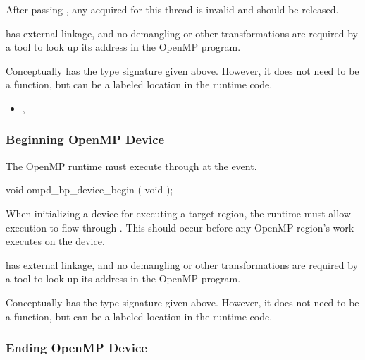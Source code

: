 After passing , any  acquired for this thread 
is invalid and should be released.

\restrictions

 has external  linkage, and no
demangling or other transformations are required by a tool
to look up its address in the OpenMP program.

Conceptually  has the type signature
given above.
However, it does not need to be a function, but can be a labeled location
in the runtime code.


\crossreferences
\begin{itemize}
\item
  , 
\end{itemize}

\subsubsection{Beginning OpenMP Device}
\label{subsubsec:ompd_bp_device_begin}

\summary
The OpenMP runtime must execute through
 at the  event.


\begin{cspecific}
\begin{ompSyntax}
void ompd_bp_device_begin ( void );
\end{ompSyntax}
\end{cspecific}


\descr

When initializing a device for executing a target region, the runtime must allow execution
to flow through .
This should occur before any OpenMP region's work executes on the device.

\restrictions

 has external  linkage, and no
demangling or other transformations are required by a tool
to look up its address in the OpenMP program.

Conceptually  has the type signature
given above.
However, it does not need to be a function, but can be a labeled location
in the runtime code.

\subsubsection{Ending OpenMP Device}
\label{subsubsec:ompd_bp_device_end}

